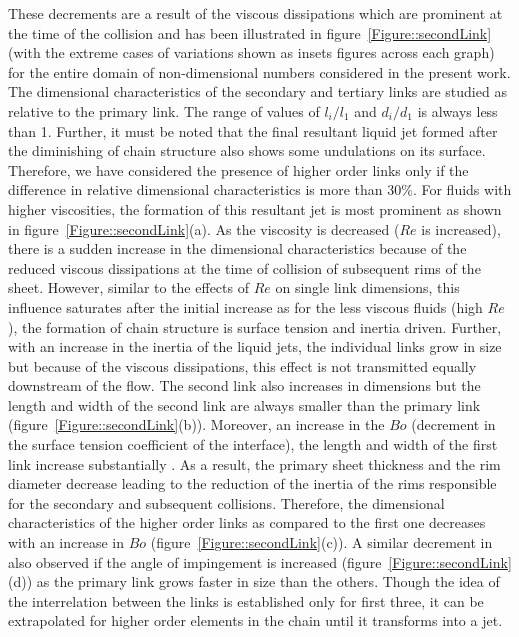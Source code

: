 These decrements are a result of the viscous dissipations which are prominent at the time of the collision and has been illustrated in figure~\ref{Figure::secondLink} (with the extreme cases of variations shown as insets figures across each graph) for the entire domain of non-dimensional numbers considered in the present work. The dimensional characteristics of the secondary and tertiary links are studied as relative to the primary link. The range of values of $l_i/l_1$ and $d_i/d_1$ is always less than 1. Further, it must be noted that the final resultant liquid jet formed after the diminishing of chain structure also shows some undulations on its surface. Therefore, we have considered the presence of higher order links only if the difference in relative dimensional characteristics is more than 30$\%$. For fluids with higher viscosities, the formation of this resultant jet is most prominent as shown in figure~\ref{Figure::secondLink}(a). As the viscosity is decreased ($Re$ is increased), there is a sudden increase in the dimensional characteristics because of the reduced viscous dissipations at the time of collision of subsequent rims of the sheet. However, similar to the effects of $Re$ on single link dimensions, this influence saturates after the initial increase as for the less viscous fluids (high $Re$), the formation of chain structure is surface tension and inertia driven. Further, with an increase in the inertia of the liquid jets, the individual links grow in size but because of the viscous dissipations, this effect is not transmitted equally downstream of the flow. The second link also increases in dimensions but the length and width of the second link are always smaller than the primary link (figure~\ref{Figure::secondLink}(b)). Moreover, an increase in the $Bo$ (decrement in the surface tension coefficient of the interface), the length and width of the first link increase substantially \citep{yang2014liquid,bremond2006atomization}. As a result, the primary sheet thickness and the rim diameter decrease leading to the reduction of the inertia of the rims responsible for the secondary and subsequent collisions. Therefore, the dimensional characteristics of the higher order links as compared to the first one decreases with an increase in $Bo$ (figure~\ref{Figure::secondLink}(c)). A similar decrement in also observed if the angle of impingement is increased (figure~\ref{Figure::secondLink}(d)) as the primary link grows faster in size than the others. Though the idea of the interrelation between the links is established only for first three, it can be extrapolated for higher order elements in the chain until it transforms into a jet.